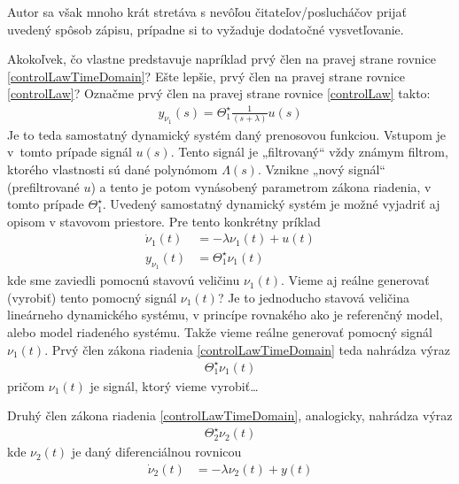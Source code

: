\documentclass[a4paper, 10pt, ]{article}
\begin{document}
Autor sa však mnoho krát stretáva s nevôľou čitateľov/poslucháčov prijať uvedený spôsob zápisu, prípadne si to vyžaduje dodatočné vysvetľovanie.





Akokoľvek, čo vlastne predstavuje napríklad prvý člen na pravej strane rovnice \eqref{controlLawTimeDomain}? Ešte lepšie, prvý člen na pravej strane rovnice \eqref{controlLaw}? Označme prvý člen na pravej strane rovnice \eqref{controlLaw} takto:
\begin{align}
	y_{\nu_1}(s) = \Theta_1^\star \frac{1}{(s + \lambda)} u(s)
\end{align}
Je to teda samostatný dynamický systém daný prenosovou funkciou. Vstupom je v~tomto prípade signál $u(s)$. Tento signál je „filtrovaný“ vždy známym filtrom, ktorého vlastnosti sú dané polynómom $\Lambda(s)$. Vznikne „nový signál“ (prefiltrované $u$) a tento je potom vynásobený parametrom zákona riadenia, v tomto prípade $\Theta_1^\star$. Uvedený samostatný dynamický systém je možné vyjadriť aj opisom v stavovom priestore. Pre tento konkrétny príklad
\begin{subequations}
    \begin{align}
         \dot \nu_1(t) &= -\lambda \nu_1(t) + u(t) \\
         y_{\nu_1}(t) &= \Theta_1^\star \nu_1(t)
    \end{align}
\end{subequations}
kde sme zaviedli pomocnú stavovú veličinu $\nu_1(t)$. Vieme aj reálne generovať (vyrobiť) tento pomocný signál $\nu_1(t)$? Je to jednoducho stavová veličina lineárneho dynamického systému, v princípe rovnakého ako je referenčný model, alebo model riadeného systému. Takže vieme reálne generovať pomocný signál $\nu_1(t)$. Prvý člen zákona riadenia \eqref{controlLawTimeDomain} teda nahrádza výraz
\begin{align}
     \Theta_1^\star \nu_1(t)
\end{align}
pričom $\nu_1(t)$ je signál, ktorý vieme vyrobiť\ldots

Druhý člen zákona riadenia \eqref{controlLawTimeDomain}, analogicky, nahrádza výraz
\begin{align}
     \Theta_2^\star \nu_2(t)
\end{align}
kde $\nu_2(t)$ je daný diferenciálnou rovnicou
\begin{align}
     \dot \nu_2(t) &= -\lambda \nu_2(t) + y(t)
\end{align}
\end{document}
